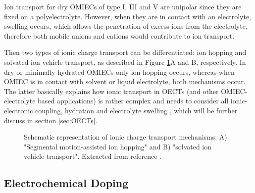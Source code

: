 Ion transport for dry OMIECs of type I, III and V are unipolar since they are fixed on a polyelectrolyte.  However, when they are in contact with an electrolyte, swelling occurs, which allows the penetration of excess ions from the electrolyte, therefore both mobile anions and cations would contribute to ion transport. 

Then two types of ionic charge transport can be differentiated: ion hopping and solvated ion vehicle transport, as described in Figure \ref{fig:itrans}A and B, respectively. In dry or minimally hydrated OMIECs only ion hopping occurs, whereas when OMIEC is in contact with solvent or liquid electrolyte, both mechanisms occur. The latter basically explains how ionic transport in OECTs (and other OMIEC-electrolyte based applications) is rather complex and needs to consider all ionic-electronic coupling, hydration and electrolyte swelling \cite{paulsenOrganicMixedIonic2020}, which will be further discuss in section \ref{sec:OECTs}.

\begin{figure}[h]
	\centering
	\hspace{2em}
	\caption{Schematic representation of ionic charge transport mechanisms: A) "Segmental motion-assisted ion hopping" and B) "solvated ion vehicle transport". Extracted from reference \cite{paulsenOrganicMixedIonic2020}.}
	\label{fig:itrans}
\end{figure}

\subsection{Electrochemical Doping}

